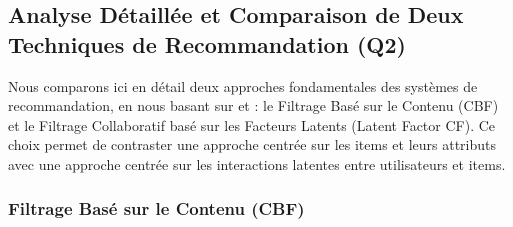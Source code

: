 \documentclass[11pt,a4paper]{article}
\begin{document}
\subsection{Analyse Détaillée et Comparaison de Deux Techniques de Recommandation (Q2)}

Nous comparons ici en détail deux approches fondamentales des systèmes de recommandation, en nous basant sur \citet{Ko2022} et \citet{Koren2011} : le Filtrage Basé sur le Contenu (CBF) et le Filtrage Collaboratif basé sur les Facteurs Latents (Latent Factor CF). Ce choix permet de contraster une approche centrée sur les items et leurs attributs avec une approche centrée sur les interactions latentes entre utilisateurs et items.

\subsubsection{Filtrage Basé sur le Contenu (CBF)}
\end{document}
